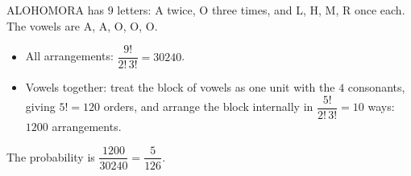 ALOHOMORA has $9$ letters: A twice, O three times, and L, H, M, R once each. The vowels are A, A, O, O, O.
\begin{itemize}
\item All arrangements: $\dfrac{9!}{2!\,3!}=30240$.
\item Vowels together: treat the block of vowels as one unit with the $4$ consonants, giving $5!=120$ orders, and arrange the block internally in $\dfrac{5!}{2!\,3!}=10$ ways: $1200$ arrangements.
\end{itemize}
The probability is $\dfrac{1200}{30240}=\boxed{\dfrac{5}{126}}$.
